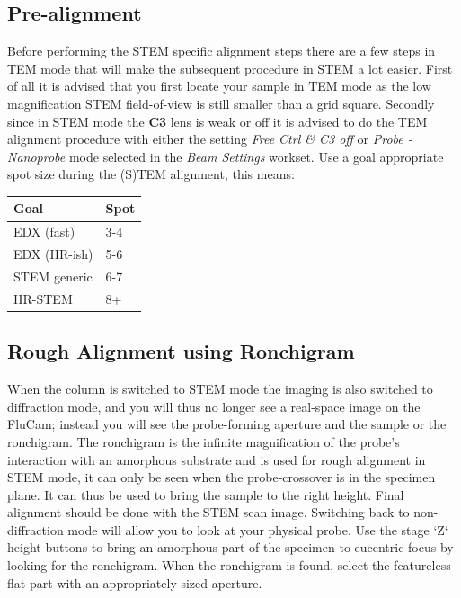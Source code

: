 \documentclass[a4paper]{scrartcl}
\begin{document}
\subsection*{Pre-alignment}
Before performing the STEM specific alignment steps there are a few steps in TEM mode that will make the subsequent procedure in STEM a lot easier. First of all it is advised that you first locate your sample in TEM mode as the low magnification STEM field-of-view is still smaller than a grid square. Secondly since in STEM mode the \textbf{C3} lens is weak or off it is advised to do the TEM alignment procedure with either the setting \textit{Free Ctrl \& C3 off} or \textit{Probe - Nanoprobe} mode selected in the \textit{Beam Settings} workset. Use a goal appropriate spot size during the (S)TEM alignment, this means:

\begin{table}[h!]
	\centering
	\begin{tabular}{l|l}
		Goal         & Spot \\ \hline
		EDX (fast)   & 3-4  \\
		EDX (HR-ish) & 5-6  \\
		STEM generic & 6-7  \\
		HR-STEM      & 8+
	\end{tabular}
\end{table}

\subsection*{Rough Alignment using Ronchigram}
When the column is switched to STEM mode the imaging is also switched to diffraction mode, and you will thus no longer see a real-space image on the FluCam; instead you will see the probe-forming aperture and the sample or the ronchigram. The ronchigram is the infinite magnification of the probe's interaction with an amorphous substrate and is used for rough alignment in STEM mode, it can only be seen when the probe-crossover is in the specimen plane. It can thus be used to bring the sample to the right height. Final alignment should be done with the STEM scan image. Switching back to non-diffraction mode will allow you to look at your physical probe.
Use the stage `Z` height buttons to bring an amorphous part of the specimen to eucentric focus by looking for the ronchigram. When the ronchigram is found, select the featureless flat part with an appropriately sized aperture.
\end{document}
